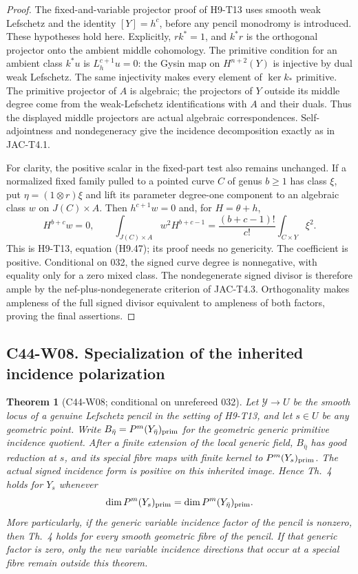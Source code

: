 \documentclass[11pt]{article}
\newtheorem{theorem}{Theorem}[section]
\theoremstyle{remark}\newtheorem{remark}[theorem]{Remark}
\begin{document}
\begin{proof}
The fixed-and-variable projector proof of H9-T13 uses smooth weak
Lefschetz and the identity $[Y]=h^c$, before any pencil monodromy is
introduced. These hypotheses hold here. Explicitly,
$rk^*=1$, and $k^*r$ is the orthogonal projector onto the ambient
middle cohomology. The primitive condition for an ambient class
$k^*u$ is $L_h^{c+1}u=0$: the Gysin map on $H^{n+2}(Y)$ is
injective by dual weak Lefschetz. The same injectivity makes every
element of $\ker k_*$ primitive. The primitive projector of $A$
is algebraic; the projectors of $Y$ outside its middle degree come
from the weak-Lefschetz identifications with $A$ and their duals.
Thus the displayed middle projectors are actual algebraic
correspondences. Self-adjointness and nondegeneracy give the
incidence decomposition exactly as in JAC-T4.1.

For clarity, the positive scalar in the fixed-part test also remains
unchanged. If a normalized fixed family pulled to a pointed curve
$C$ of genus $b\geq1$ has class $\xi$, put $\eta=(1\otimes r)\xi$
and lift its parameter degree-one component to an algebraic class
$w$ on $J(C)\times A$. Then $h^{c+1}w=0$ and, for
$H=\theta+h$,
\[
 H^{b+c}w=0,\qquad
 \int_{J(C)\times A}w^2H^{b+c-1}
   =\frac{(b+c-1)!}{c!}\int_{C\times Y}\xi^2.
\]
This is H9-T13, equation (H9.47); its proof needs no genericity.
The coefficient is positive. Conditional on 032, the signed curve
degree is nonnegative, with equality only for a zero mixed class.
The nondegenerate signed divisor is therefore ample by the
nef-plus-nondegenerate criterion of JAC-T4.3. Orthogonality makes
ampleness of the full signed divisor equivalent to ampleness of
both factors, proving the final assertions.
\end{proof}

\subsection*{C44-W08. Specialization of the inherited incidence polarization}

\begin{theorem}[C44-W08; conditional on unrefereed 032]
Let $\mathscr Y\to U$ be the smooth locus of a genuine Lefschetz
pencil in the setting of H9-T13, and let $s\in U$ be any geometric
point. Write $B_{\bar\eta}=P^m(Y_{\bar\eta})_{\rm prim}$ for the
geometric generic primitive incidence quotient. After a finite
extension of the local generic field, $B_{\bar\eta}$ has good
reduction at $s$, and its special fibre maps with finite kernel to
$P^m(Y_s)_{\rm prim}$. The actual signed incidence form is positive
on this inherited image. Hence Th.~4 holds for $Y_s$ whenever
\begin{equation}\label{c44:no-incidence-jump}
 \dim P^m(Y_s)_{\rm prim}=\dim P^m(Y_{\bar\eta})_{\rm prim}.
\end{equation}
More particularly, if the generic variable incidence factor of the
pencil is nonzero, then Th.~4 holds for every smooth geometric fibre
of the pencil. If that generic factor is zero, only the new
variable incidence directions that occur at a special fibre remain
outside this theorem.
\end{theorem}
\end{document}
